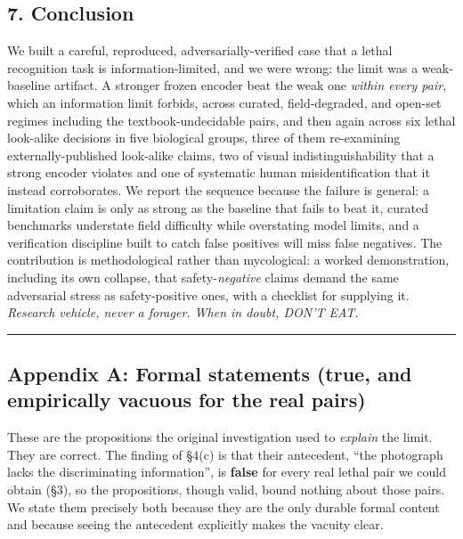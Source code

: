 \subsection{7. Conclusion}\label{conclusion}

We built a careful, reproduced, adversarially-verified case that a
lethal recognition task is information-limited, and we were wrong: the
limit was a weak-baseline artifact. A stronger frozen encoder beat the
weak one \emph{within every pair}, which an information limit forbids,
across curated, field-degraded, and open-set regimes including the
textbook-undecidable pairs, and then again across six lethal look-alike
decisions in five biological groups, three of them re-examining
externally-published look-alike claims, two of visual
indistinguishability that a strong encoder violates and one of
systematic human misidentification that it instead corroborates. We
report the sequence because the failure is general: a limitation claim
is only as strong as the baseline that fails to beat it, curated
benchmarks understate field difficulty while overstating model limits,
and a verification discipline built to catch false positives will miss
false negatives. The contribution is methodological rather than
mycological: a worked demonstration, including its own collapse, that
safety-\emph{negative} claims demand the same adversarial stress as
safety-positive ones, with a checklist for supplying it. \emph{Research
vehicle, never a forager. When in doubt, DON'T EAT.}

\begin{center}\rule{0.5\linewidth}{0.5pt}\end{center}

\subsection{Appendix A: Formal statements (true, and empirically vacuous
for the real
pairs)}\label{appendix-a-formal-statements-true-and-empirically-vacuous-for-the-real-pairs}

These are the propositions the original investigation used to
\emph{explain} the limit. They are correct. The finding of §4(c) is that
their antecedent, ``the photograph lacks the discriminating
information'', is \textbf{false} for every real lethal pair we could
obtain (§3), so the propositions, though valid, bound nothing about
those pairs. We state them precisely both because they are the only
durable formal content and because seeing the antecedent explicitly
makes the vacuity clear.

